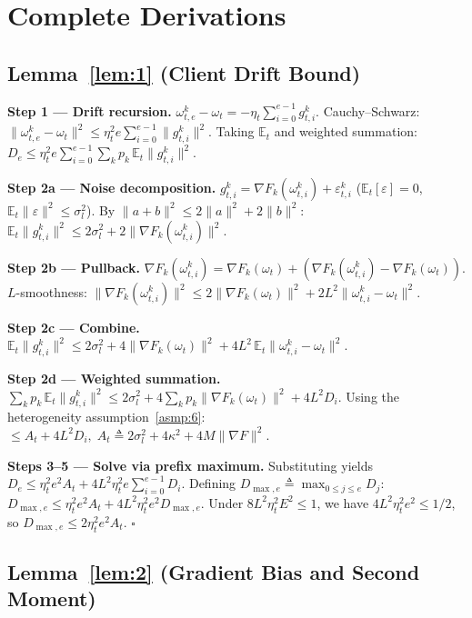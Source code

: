 \documentclass[journal]{IEEEtran}
\begin{document}
\section{Complete Derivations}\label{app:B}

\subsection*{Lemma~\ref{lem:1} (Client Drift Bound)}

\noindent\textbf{Step 1 --- Drift recursion.}
\(\omega_{t,e}^k - \omega_t = -\eta_t\sum_{i=0}^{e-1}g_{t,i}^k\).
Cauchy--Schwarz:
\(\|\omega_{t,e}^k - \omega_t\|^2 \le \eta_t^2 e\sum_{i=0}^{e-1}\|g_{t,i}^k\|^2\).
Taking \(\mathbb E_t\) and weighted summation:
\(D_e \le \eta_t^2 e\sum_{i=0}^{e-1}\sum_k p_k\,\mathbb E_t\|g_{t,i}^k\|^2\).

\noindent\textbf{Step 2a --- Noise decomposition.}
\(g_{t,i}^k = \nabla F_k(\omega_{t,i}^k) + \varepsilon_{t,i}^k\)
(\(\mathbb E_t[\varepsilon] = 0\), \(\mathbb E_t\|\varepsilon\|^2 \le \sigma_l^2\)).
By \(\|a+b\|^2 \le 2\|a\|^2 + 2\|b\|^2\):
\(\mathbb E_t\|g_{t,i}^k\|^2 \le 2\sigma_l^2 + 2\|\nabla F_k(\omega_{t,i}^k)\|^2\).

\noindent\textbf{Step 2b --- Pullback.}
\(\nabla F_k(\omega_{t,i}^k) = \nabla F_k(\omega_t) + (\nabla F_k(\omega_{t,i}^k) - \nabla F_k(\omega_t))\).
\(L\)-smoothness:
\(\|\nabla F_k(\omega_{t,i}^k)\|^2 \le 2\|\nabla F_k(\omega_t)\|^2 + 2L^2\|\omega_{t,i}^k - \omega_t\|^2\).

\noindent\textbf{Step 2c --- Combine.}
\(\mathbb E_t\|g_{t,i}^k\|^2 \le 2\sigma_l^2 + 4\|\nabla F_k(\omega_t)\|^2 + 4L^2\,\mathbb E_t\|\omega_{t,i}^k - \omega_t\|^2\).

\noindent\textbf{Step 2d --- Weighted summation.}
\(\sum_k p_k\,\mathbb E_t\|g_{t,i}^k\|^2
 \le 2\sigma_l^2 + 4\sum_k p_k\|\nabla F_k(\omega_t)\|^2 + 4L^2 D_i\).
Using the heterogeneity assumption~\ref{asmp:6}:
\(\le A_t + 4L^2 D_i,\; A_t \triangleq 2\sigma_l^2 + 4\kappa^2 + 4M\|\nabla F\|^2\).

\noindent\textbf{Steps 3--5 --- Solve via prefix maximum.}
Substituting yields \(D_e \le \eta_t^2 e^2 A_t + 4L^2\eta_t^2 e\sum_{i=0}^{e-1}D_i\).
Defining \(D_{\max,e} \triangleq \max_{0\le j\le e} D_j\):
\(D_{\max,e} \le \eta_t^2 e^2 A_t + 4L^2\eta_t^2 e^2 D_{\max,e}\).
Under \(8L^2\eta_t^2 E^2 \le 1\), we have \(4L^2\eta_t^2 e^2 \le 1/2\),
so \(D_{\max,e} \le 2\eta_t^2 e^2 A_t\). \(\square\)

\subsection*{Lemma~\ref{lem:2} (Gradient Bias and Second Moment)}
\end{document}
